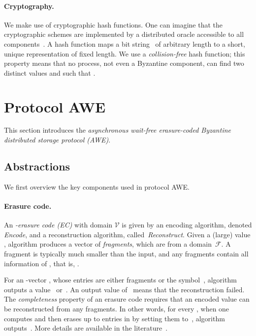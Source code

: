 \documentclass[oribibl]{llncs}
\theoremstyle{definition-boldhead}
\newcommand{\op}[1]{\textsl{#1}}
\newcommand{\values}{\ensuremath{\mathcal{V}}\xspace}
\newcommand{\fragments}{\ensuremath{\mathcal{F}}\xspace}
\newcommand{\NAME}{AWE\xspace}
\begin{document}
\paragraph{Cryptography.}
We make use of cryptographic hash functions.
One can imagine that the cryptographic schemes are implemented by a
distributed oracle accessible to all components~\cite{CachinGR11}.  A
hash function  maps a bit string~ of arbitrary length to a
short, unique representation of fixed length.  We use a
\emph{collision-free} hash function; this property means that no
process, not even a Byzantine component, can find two distinct values
 and  such that .


\section{Protocol \NAME}
\label{sec:protocol}

\if\submit\no
This section introduces the \emph{asynchronous wait-free erasure-coded
Byzantine distributed storage protocol (AWE)}.



\subsection{Abstractions}
\fi

\if\submit\yes
We first overview the key components used in protocol \NAME.
\fi

\paragraph{Erasure code.}
An \emph{-erasure code (EC)} with domain \values is given by
an encoding algorithm, denoted \op{Encode}, and a reconstruction
algorithm, called~\op{Reconstruct}.
Given a (large) value , algorithm
 produces a vector  of 
\emph{fragments}, which are from a domain~\fragments.  A fragment is
typically much smaller than the input, and any  fragments contain
all information of , that is, .

For an -vector , whose
entries are either fragments or the symbol~, algorithm
 outputs a value~ or~.
An output value of~ means that the reconstruction failed.  The
\emph{completeness} property of an erasure code requires that an encoded value
can be reconstructed from any  fragments.
In other words, for every , when one computes  and then erases up to  entries in
 by setting them to~, algorithm 
outputs~.
\if\submit\no
More details are available in the
literature~\cite{rabin89,plank05}.
\fi
\end{document}
